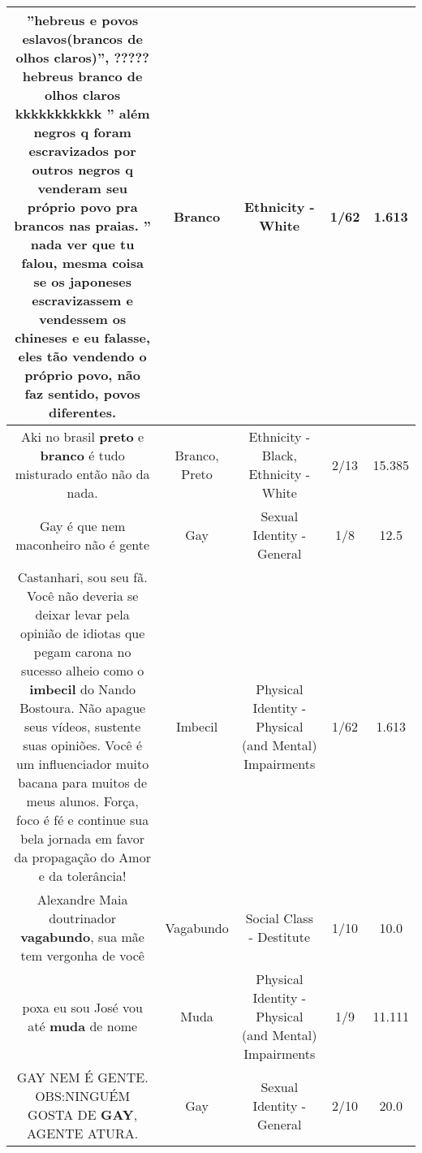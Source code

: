 \documentclass[11pt]{article}
\newlength\mylength
\begin{document}
\begin{center}
\begin{longtable}{|C{.65\mylength}|C{.30\mylength}|C{.12\mylength}|C{.12\mylength}|C{.12\mylength}|}
  \small ''hebreus e povos eslavos(brancos de olhos claros)'', ????? hebreus \textbf{branco} de olhos claros kkkkkkkkkkk  '' além negros q foram escravizados por outros negros q venderam seu próprio povo pra brancos nas praias. '' nada ver que tu falou, mesma coisa se os japoneses escravizassem e vendessem os chineses e eu falasse, eles tão vendendo o próprio povo, não faz sentido, povos diferentes.\normalsize   & Branco & Ethnicity - White & 1/62 & 1.613 \\  \hline
  \small Aki no brasil \textbf{preto} e \textbf{branco} é tudo misturado então não da nada.\normalsize   & Branco, Preto & Ethnicity - Black, Ethnicity - White & 2/13 & 15.385 \\  \hline
  \small Gay é que nem maconheiro não é gente\normalsize   & Gay & Sexual Identity - General & 1/8 & 12.5 \\  \hline
  \small Castanhari, sou seu fã. Você não deveria se deixar levar pela opinião de idiotas que pegam carona no sucesso alheio como o \textbf{imbecil} do Nando Bostoura. Não apague seus vídeos, sustente suas opiniões. Você é um influenciador muito bacana para muitos de meus alunos. Força, foco é fé e continue sua bela jornada em favor da propagação do Amor e da tolerância!\normalsize   & Imbecil & Physical Identity - Physical (and Mental) Impairments & 1/62 & 1.613 \\  \hline
  \small Alexandre Maia doutrinador \textbf{vagabundo}, sua mãe tem vergonha de você\normalsize   & Vagabundo & Social Class - Destitute & 1/10 & 10.0 \\  \hline
  \small poxa eu sou José vou até \textbf{muda} de nome\normalsize   & Muda & Physical Identity - Physical (and Mental) Impairments & 1/9 & 11.111 \\  \hline
  \small GAY NEM É GENTE. OBS:NINGUÉM GOSTA DE \textbf{GAY}, AGENTE ATURA.\normalsize   & Gay & Sexual Identity - General & 2/10 & 20.0 \\  \hline

\end{longtable}
\end{center}
\end{document}
